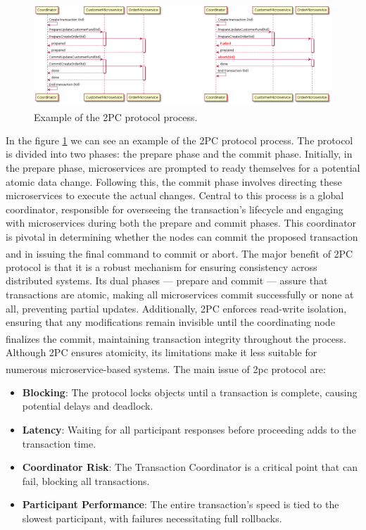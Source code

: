 \begin{figure}
    \centering
    \includegraphics[scale=0.55]{Pictures/3_2pc.png}
    \caption{Example of the 2PC protocol process\textsuperscript{\cite{2pc_2}}.}
    \label{fig:3_2pc}
\end{figure}

In the figure \ref{fig:3_2pc} we can see an example of the 2PC protocol process. The protocol is divided
into two phases: the prepare phase and the commit phase. Initially, in the prepare phase,
microservices are prompted to ready themselves for a potential atomic data change. Following this,
the commit phase involves directing these microservices to execute the actual changes. Central to
this process is a global coordinator, responsible for overseeing the transaction's lifecycle and
engaging with microservices during both the prepare and commit phases. This coordinator is pivotal
in determining whether the nodes can commit the proposed transaction and in issuing the final
command to commit or abort\textsuperscript{\cite{2pc_1}}\textsuperscript{\cite{2pc_2}}.
\newline\newline
The major benefit of 2PC protocol is that it is a robust mechanism for ensuring consistency across
distributed systems. Its dual phases — prepare and commit — assure that transactions are atomic,
making all microservices commit successfully or none at all, preventing partial updates.
Additionally, 2PC enforces read-write isolation, ensuring that any modifications remain invisible
until the coordinating node finalizes the commit, maintaining transaction integrity throughout the
process\textsuperscript{\cite{2pc_2}}.
\newline\newline
Although 2PC ensures atomicity, its limitations make it less suitable for numerous
microservice-based systems\textsuperscript{\cite{2pc_2}}. The main issue of 2pc protocol
are\textsuperscript{\cite{2pc_3}}:

\begin{itemize}
    \item \textbf{Blocking}: The protocol locks objects until a transaction is complete, causing
          potential delays and deadlock.
    \item \textbf{Latency}: Waiting for all participant responses before proceeding adds to the
          transaction time.
    \item \textbf{Coordinator Risk}: The Transaction Coordinator is a critical point that can fail,
          blocking all transactions.
    \item \textbf{Participant Performance}: The entire transaction's speed is tied to the slowest
          participant, with failures necessitating full rollbacks.
\end{itemize}


